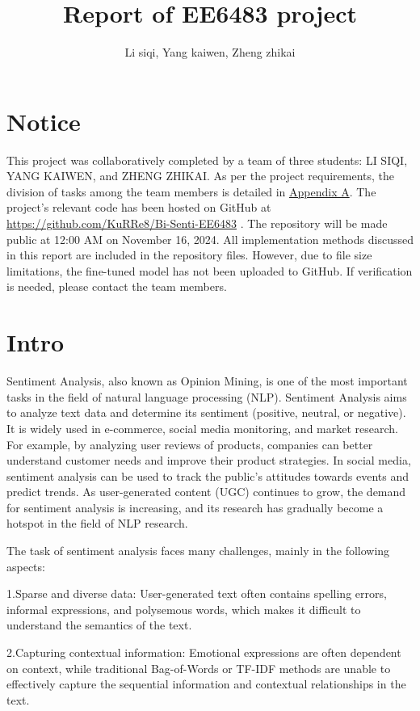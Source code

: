 \documentclass{article}
\title{Report of EE6483 project}
\author{ Li siqi, Yang kaiwen, Zheng zhikai}
\begin{document}
\maketitle
\section{Notice}

This project was collaboratively completed by a team of three students: LI SIQI, YANG KAIWEN, and ZHENG ZHIKAI. As per the project requirements, the division of tasks among the team members is detailed in \hyperlink{apdxA}{Appendix A}. The project's relevant code has been hosted on GitHub at \url{https://github.com/KuRRe8/Bi-Senti-EE6483} . The repository will be made public at 12:00 AM on November 16, 2024. All implementation methods discussed in this report are included in the repository files. However, due to file size limitations, the fine-tuned model has not been uploaded to GitHub. If verification is needed, please contact the team members.

\section{Intro}

\hypertarget{hpa.1}{{}} Sentiment Analysis, also known as Opinion Mining, is one of the most important tasks in the field of natural language processing (NLP). Sentiment Analysis aims to analyze text data and determine its sentiment (positive, neutral, or negative). It is widely used in e-commerce, social media monitoring, and market research. For example, by analyzing user reviews of products, companies can better understand customer needs and improve their product strategies. In social media, sentiment analysis can be used to track the public's attitudes towards events and predict trends. As user-generated content (UGC) continues to grow, the demand for sentiment analysis is increasing, and its research has gradually become a hotspot in the field of NLP research.

The task of sentiment analysis faces many challenges, mainly in the following aspects:
 
 1.Sparse and diverse data: User-generated text often contains spelling errors, informal expressions, and polysemous words, which makes it difficult to understand the semantics of the text.
 
 2.Capturing contextual information: Emotional expressions are often dependent on context, while traditional Bag-of-Words or TF-IDF {\color{blue}{[1]}} methods are unable to effectively capture the sequential information and contextual relationships in the text.
 
\end{document}
